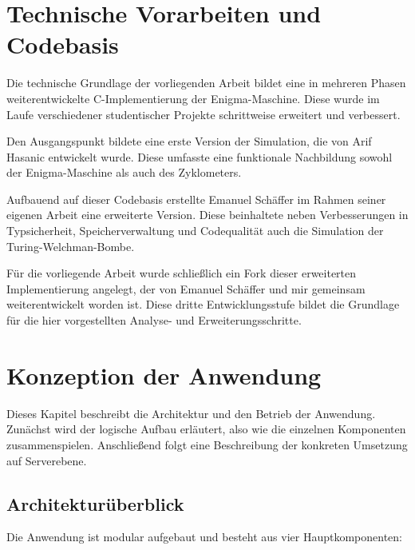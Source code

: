 \documentclass[12pt, ngerman, a4paper, numbers=noenddot]{article}
\begin{document}
\section{Technische Vorarbeiten und Codebasis}
\label{sec:analyse_c_implementation}

Die technische Grundlage der vorliegenden Arbeit bildet eine in mehreren Phasen weiterentwickelte C-Implementierung der Enigma-Maschine. Diese wurde im Laufe verschiedener studentischer Projekte schrittweise erweitert und verbessert.

Den Ausgangspunkt bildete eine erste Version der Simulation, die von Arif Hasanic entwickelt wurde. Diese umfasste eine funktionale Nachbildung sowohl der Enigma-Maschine als auch des Zyklometers\autocite{hasanic2024enigma}.

Aufbauend auf dieser Codebasis erstellte Emanuel Schäffer im Rahmen seiner eigenen Arbeit eine erweiterte Version. Diese beinhaltete neben Verbesserungen in Typsicherheit, Speicherverwaltung und Codequalität auch die Simulation der Turing-Welchman-Bombe\autocite{schaffer2025enigma}.

Für die vorliegende Arbeit wurde schließlich ein Fork dieser erweiterten Implementierung angelegt, der von Emanuel Schäffer und mir gemeinsam weiterentwickelt worden ist\autocite{schaffer2025enigmaserver}. Diese dritte Entwicklungsstufe bildet die Grundlage für die hier vorgestellten Analyse- und Erweiterungsschritte.



\newpage
\section{Konzeption der Anwendung}

Dieses Kapitel beschreibt die Architektur und den Betrieb der Anwendung. Zunächst wird der logische Aufbau erläutert, also wie die einzelnen Komponenten zusammenspielen. Anschließend folgt eine Beschreibung der konkreten Umsetzung auf Serverebene.

\subsection{Architekturüberblick}

Die Anwendung ist modular aufgebaut und besteht aus vier Hauptkomponenten:
\end{document}
